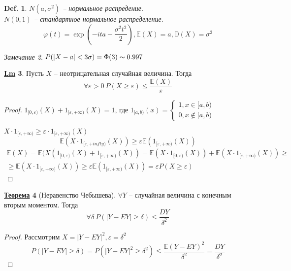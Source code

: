 \documentclass[12pt]{article}
\def\E{\mathbb{E}}
\def\D{\mathbb{D}}
\def\PHI{\varphi}        %
\theoremstyle{definition} %
\newtheorem{Thm}{\underline{Теорема}}[subsection] %
\newtheorem{Lm}[Thm]{\underline{Lm}} %
\theoremstyle{plain} %
\newtheorem{Def}[Thm]{Def.} %
\theoremstyle{remark} %
\newtheorem{Rem}[Thm]{Замечание} %
\begin{document}
\begin{Def}
    $N(a, \sigma^2)$ -- нормальное распредение. \\
    $N(0, 1)$ -- стандартное нормальное распределение. 
    \[\PHI(t) = \exp \left(-ita - \frac{\sigma^2 t^2}{2}\right), \E(X) = a, \D(X) = \sigma^2\]
\end{Def}

\begin{Rem}
    $P(|X - a| < 3\sigma) = \Phi(3) \thicksim 0.997$ 
\end{Rem}

\begin{Lm}
    Пусть $X$ -- неотрицательная случайная величина. Тогда
    \[\forall \varepsilon > 0 \ P(X \geqslant \varepsilon) \leqslant \frac{\E(X)}{\varepsilon}\] 
\end{Lm}

\begin{proof}
    $1_{[0, \varepsilon)}(X) + 1_{[\varepsilon, +\infty)}(X) = 1$, где $1_{[a, b)}(x) = \begin{cases}
        1, x \in [a, b) \\
        0, x \notin [a, b)
    \end{cases}$  

    $X \cdot 1_{[\varepsilon, +\infty)} \geqslant \varepsilon \cdot 1_{[\varepsilon, +\infty)}(X)$ 
    \[\E(X \cdot 1_{[\varepsilon, +infty)}(X)) \geqslant \varepsilon \E(1_{[\varepsilon, +\infty)}(X))\]
    \begin{gather*}
        \E(X) = \E(X(1_{[0, \varepsilon)} (X) + 1_{[\varepsilon, +\infty)}(X)) = \E(X \cdot 1_{[0, \varepsilon)}(X)) + \E(X \cdot 1_{[\varepsilon, +\infty)}(X)) \geqslant \\
        \geqslant \E(X \cdot 1_{[\varepsilon, +\infty)}(X)) \geqslant \varepsilon \E(1_{[\varepsilon, +\infty)}(X)) = \varepsilon P(X \geqslant \varepsilon)
    \end{gather*}
\end{proof}

\begin{Thm}[Неравенство Чебышева]
    $\forall Y$ -- случайная величина с конечным вторым моментом. Тогда
    \[\forall \delta \ P(|Y - EY| \geqslant \delta) \leqslant \frac{DY}{\delta^2}\]
\end{Thm}

\begin{proof}
    Рассмотрим $X = |Y - EY|^2, \varepsilon = \delta^2$
    \[P(|Y - EY| \geqslant \delta) = P(|Y - EY|^2 \geqslant \delta^2) \leqslant \frac{\E(Y - EY)^2}{\delta^2} = \frac{DY}{\delta^2}\] 
\end{proof}
\end{document}
